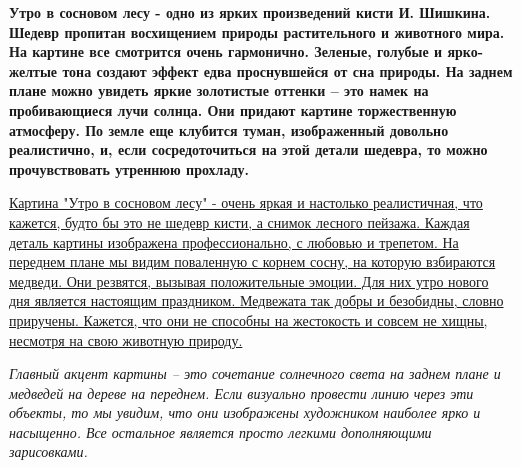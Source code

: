 \documentclass[11pt]{report}
\begin{document}
	{\small {\bf Утро в сосновом лесу - одно из ярких произведений кисти
И. Шишкина. Шедевр пропитан восхищением природы растительного и
животного мира. На картине все смотрится очень гармонично. Зеленые,
голубые и ярко-желтые тона создают эффект едва проснувшейся от сна
природы. На заднем плане можно увидеть яркие золотистые оттенки –
это намек на пробивающиеся лучи солнца. Они придают картине
торжественную атмосферу. По земле еще клубится туман, изображенный
довольно реалистично, и, если сосредоточиться на этой детали
шедевра, то можно прочувствовать утреннюю прохладу.}}

	\uline{   Картина "Утро в сосновом лесу" - очень яркая и настолько
реалистичная, что кажется, будто бы это не шедевр кисти, а снимок
лесного пейзажа. Каждая деталь картины изображена профессионально, с
любовью и трепетом. На переднем плане мы видим поваленную с корнем
сосну, на которую взбираются медведи. Они резвятся, вызывая
положительные эмоции. Для них утро нового дня является настоящим
праздником. Медвежата так добры и безобидны, словно приручены.
Кажется, что они не способны на жестокость и совсем не хищны,
несмотря на свою животную природу. }

	{\LARGE {\it  Главный акцент картины – это сочетание солнечного
света на заднем плане и медведей на дереве на переднем. Если
визуально провести линию через эти объекты, то мы увидим, что они
изображены художником наиболее ярко и насыщенно. Все остальное
является просто легкими дополняющими зарисовками.}}
\end{document}
